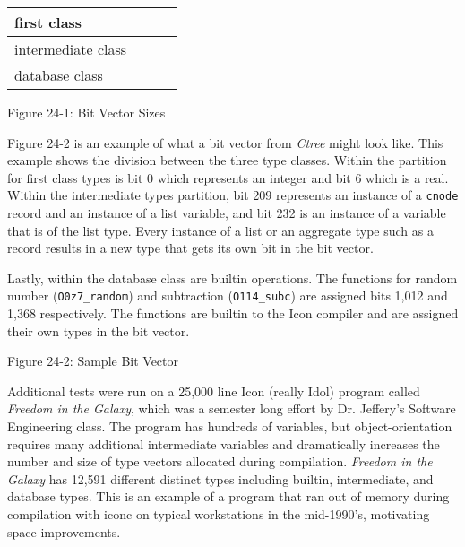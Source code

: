 \begin{center}
\tabletail{}
\tablelasttail{}
\begin{supertabular}{|m{1.2191598in}|m{1.1629599in}|m{1.2455599in}|m{1.6080599in}|}
\hline
 first class &
 &
 &
\raggedleft{}\\\hline
 intermediate class &
 &
 &
\raggedleft{}\\\hline
 database class &
 &
 &
\raggedleft{}\\\hline
\end{supertabular}
\end{center}
{\centering{}
Figure 24-1: Bit Vector Sizes
\par}


Figure 24-2 is an example of what a bit vector from \textit{Ctree}
might look like. This example shows the division between the three
type classes. Within the partition for first class types is bit 0
which represents an integer and bit 6 which is a real. Within the
intermediate types partition, bit 209 represents an instance of a
\texttt{cnode} record and an instance of a list variable, and bit 232
is an instance of a variable that is of the list type. Every instance
of a list or an aggregate type such as a record results in a new type
that gets its own bit in the bit vector.

Lastly, within the database class are builtin operations. The
functions for random number (\texttt{O0z7\_random}) and subtraction
(\texttt{O114\_subc}) are assigned bits 1,012 and 1,368
respectively. The functions are builtin to the Icon compiler and are
assigned their own types in the bit vector.

\bigskip

{\centering{}
Figure 24-2: Sample Bit Vector
\par}

Additional tests were run on a 25,000 line Icon (really Idol) program
called \textit{Freedom in the Galaxy}, which was a semester long
effort by Dr. Jeffery's Software Engineering class. The program has
hundreds of variables, but object-orientation requires many additional
intermediate variables and dramatically increases the number and
size of type vectors allocated during compilation. \textit{Freedom in
the Galaxy} has 12,591 different distinct types including builtin,
intermediate, and database types. This is an example of a program that
ran out of memory during compilation with iconc on typical
workstations in the mid-1990's, motivating space improvements.

